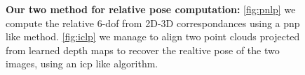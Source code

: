 \begin{figure}
	\centering
	
    \begin{minipage}{0.5\linewidth}
    \end{minipage}\hfill
	\begin{minipage}{0.5\linewidth}
	\end{minipage}
	
	\caption[Relative pose computation methods]{\textbf{Our two method for relative pose computation:} \ref{fig:pnlp} we compute the relative 6-\ac{dof} from 2D-3D correspondances using a \ac{pnp} like method. \ref{fig:iclp} we manage to align two point clouds projected from learned depth maps to recover the realtive pose of the two images, using an \ac{icp} like algorithm.\label{fig:relative_pose}}
\end{figure}
